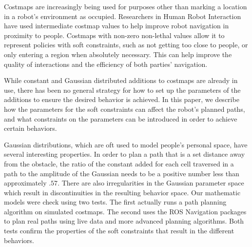 Costmaps are increasingly being used for purposes other than marking a location in a robot's environment as occupied. Researchers in Human Robot Interaction have used intermediate costmap values to help improve robot navigation in proximity to people. Costmaps with non-zero non-lethal values allow it to represent policies with soft constraints, such as not getting too close to people, or only entering a region when absolutely necessary. This can help improve the quality of interactions and the efficiency of both parties' navigation. 

While constant and Gaussian distributed additions to costmaps are already in use, there has been no general strategy for how to set up the parameters of the additions to ensure the desired behavior is achieved. In this paper, we describe how the parameters for the soft constraints can affect the robot's planned paths, and what constraints on the parameters can be introduced in order to achieve certain behaviors. 

Gaussian distributions, which are oft used to model people's personal space, have several interesting properties. In order to plan a path that is a set distance away from the obstacle, the ratio of the constant added for each cell traversed in a path to the amplitude of the Gaussian needs to be a positive number less than approximately $.57$.  There are also irregularities in the Gaussian parameter space which result in discontinuities in the resulting behavior space. Our mathematic models were check using two tests. The first actually runs a path planning algorithm on simulated costmaps. The second uses the ROS Navigation packages to plan real paths using live data and more advanced planning algorithms. Both tests confirm the properties of the soft constraints that result in the different behaviors. 

